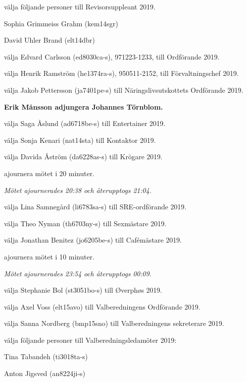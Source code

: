 \documentclass[10pt]{article}
\begin{document}
\begin{paragrafer}
\begin{paralist}
    \Mba välja följande personer till Revisorsuppleant 2019.
    \begin{tightdashlist}
        \item Sophia Grimmeiss Grahm (kem14sgr)
        \item David Uhler Brand (elt14dbr)
    \end{tightdashlist}

    \Mba välja Edvard Carlsson (ed8030ca-s), 971223-1233, till Ordförande 2019.

    \Mba välja Henrik Ramström (he1374ra-s), 950511-2152, till Förvaltningschef 2019.

    \Mba välja Jakob Pettersson (ja7401pe-s) till Näringslivsutskottets Ordförande 2019.

    \textbf{Erik Månsson \ypa adjungera Johannes Törnblom.}

    \textbf{\Mbaby}

    \Mba välja Saga Åslund (ad6718be-s) till Entertainer 2019.

    \Mba välja Sonja Kenari (nat14sta) till Kontaktor 2019.

    \Mba välja Davida Åström (da6228as-s) till Krögare 2019.
    
    \Mba ajournera mötet i 20 minuter.

    \emph{Mötet ajournerades 20:38 och återupptogs 21:04.}

    \Mba välja Lina Samnegård (li6783sa-s) till SRE-ordförande 2019.

    \Mba välja Theo Nyman (th6703ny-s) till Sexmästare 2019.

    \Mba välja Jonathan Benitez (jo6205be-s) till Cafémästare 2019.

    \Mba ajournera mötet i 10 minuter.

    \emph{Mötet ajournerades 23:54 och återupptogs 00:09.}
    
    \Mba välja Stephanie Bol (st3051bo-s) till Øverphøs 2019.
    
    
    \Mba välja Axel Voss (elt15avo) till Valberedningens Ordförande 2019.
    
    \Mba välja Sanna Nordberg (bmp15sno) till Valberedningens sekreterare 2019.
    
    \Mba välja följande personer till Valberedningsledamöter 2019:
    \begin{tightdashlist}
        \item Tina Tabandeh (ti3018ta-s)
        \item Anton Jigsved (an8224ji-s)
    \end{tightdashlist}
    

\end{paralist}
\end{paragrafer}
\end{document}
